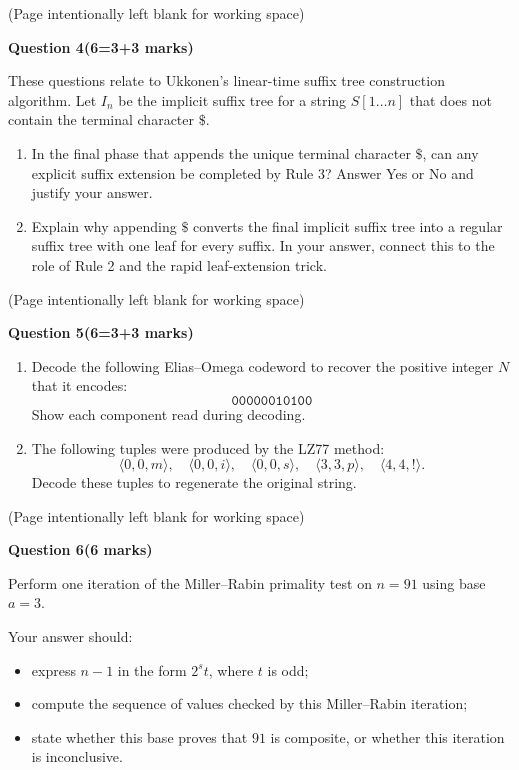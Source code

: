 \documentclass[12pt,letterpaper]{article}
\newcommand{\marksbox}[1]{%
  \vfill
  \begin{flushright}
    \fbox{\parbox[c][1.1cm][c]{1.3cm}{\centering #1}}
  \end{flushright}
}
\newcommand{\questiontitle}[2]{%
  \textbf{Question #1}\hfill\textbf{(#2 marks)}
}
\newcommand{\workingpage}{%
  \newpage
  \begin{center}
    (Page intentionally left blank for working space)
  \end{center}
}
\begin{document}
\marksbox{6}

\workingpage
\newpage

\questiontitle{4}{6=3+3}

These questions relate to Ukkonen's linear-time suffix tree construction
algorithm. Let $I_n$ be the implicit suffix tree for a string $S[1 \ldots n]$
that does not contain the terminal character $\$$.

\begin{enumerate}
  \item[(i)] In the final phase that appends the unique terminal character
  $\$$, can any explicit suffix extension be completed by Rule 3? Answer Yes or
  No and justify your answer.

  \item[(ii)] Explain why appending $\$$ converts the final implicit suffix tree
  into a regular suffix tree with one leaf for every suffix. In your answer,
  connect this to the role of Rule 2 and the rapid leaf-extension trick.
\end{enumerate}

\marksbox{6}

\workingpage
\newpage

\questiontitle{5}{6=3+3}

\begin{enumerate}
  \item[(i)] Decode the following Elias--Omega codeword to recover the positive
  integer $N$ that it encodes:
  \[
    \texttt{00000010100}
  \]
  Show each component read during decoding.

  \item[(ii)] The following tuples were produced by the LZ77 method:
  \[
    \langle 0,0,m\rangle,\quad
    \langle 0,0,i\rangle,\quad
    \langle 0,0,s\rangle,\quad
    \langle 3,3,p\rangle,\quad
    \langle 4,4,!\rangle.
  \]
  Decode these tuples to regenerate the original string.
\end{enumerate}

\marksbox{6}

\workingpage
\newpage

\questiontitle{6}{6}

Perform one iteration of the Miller--Rabin primality test on $n = 91$ using
base $a = 3$.

Your answer should:
\begin{itemize}
  \item express $n-1$ in the form $2^s t$, where $t$ is odd;
  \item compute the sequence of values checked by this Miller--Rabin iteration;
  \item state whether this base proves that $91$ is composite, or whether this
  iteration is inconclusive.
\end{itemize}
\end{document}
